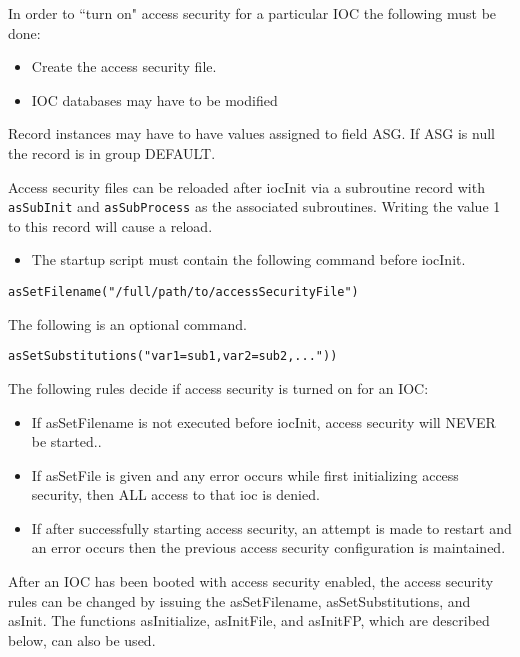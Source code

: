 In order to ``turn on" access security for a particular IOC the following must be done:

\begin{itemize}\item Create the access security file.

\item IOC databases may have to be modified

\end{itemize}Record instances may have to have values assigned to field ASG. If ASG is null the record is in group 
DEFAULT. 

Access security files can be reloaded after iocInit via a subroutine record with \verb|asSubInit| and 
\verb|asSubProcess| as the associated subroutines. Writing the value 1 to this record will cause a reload.

\begin{itemize}\item The startup script must contain the following command before iocInit.

\end{itemize}\begin{verbatim}asSetFilename("/full/path/to/accessSecurityFile")
\end{verbatim}\begin{description}\item The following is an optional command.

\end{description}\begin{verbatim}asSetSubstitutions("var1=sub1,var2=sub2,..."))
\end{verbatim}The following rules decide if access security is turned on for an IOC:

\begin{itemize}\item If asSetFilename is not executed before iocInit, access security will NEVER be started..

\item If asSetFile is given and any error occurs while first initializing access security, then ALL access to that ioc is 
denied.

\item If after successfully starting access security, an attempt is made to restart and an error occurs then the previous 
access security configuration is maintained.

\end{itemize}After an IOC has been booted with access security enabled, the access security rules can be changed by issuing the 
asSetFilename, asSetSubstitutions, and asInit. The functions asInitialize, asInitFile, and asInitFP, which are described 
below, can also be used.

